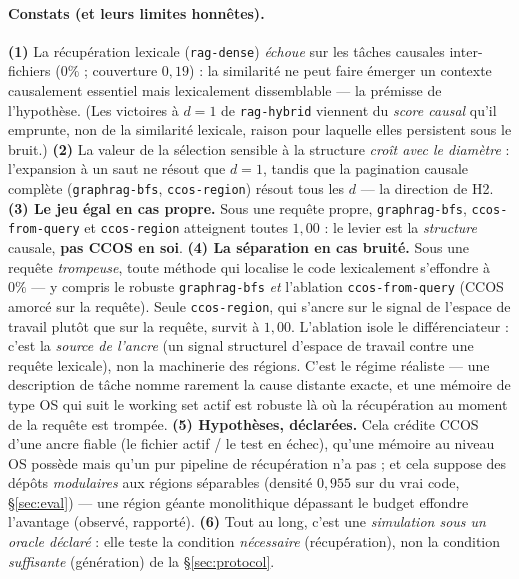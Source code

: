 \documentclass[11pt]{article}
\newcommand{\code}[1]{\texttt{#1}}
\begin{document}
\paragraph{Constats (et leurs limites honnêtes).}
\textbf{(1)} La récupération lexicale (\code{rag-dense}) \emph{échoue} sur les tâches
causales inter-fichiers ($0\%$ ; couverture $0{,}19$) : la similarité ne peut faire
émerger un contexte causalement essentiel mais lexicalement dissemblable --- la
prémisse de l'hypothèse. (Les victoires à $d{=}1$ de \code{rag-hybrid} viennent du
\emph{score causal} qu'il emprunte, non de la similarité lexicale, raison pour
laquelle elles persistent sous le bruit.)
\textbf{(2)} La valeur de la sélection sensible à la structure \emph{croît avec le
diamètre} : l'expansion à un saut ne résout que $d{=}1$, tandis que la pagination
causale complète (\code{graphrag-bfs}, \code{ccos-region}) résout tous les $d$ --- la
direction de H2.
\textbf{(3) Le jeu égal en cas propre.} Sous une requête propre, \code{graphrag-bfs},
\code{ccos-from-query} et \code{ccos-region} atteignent toutes $1{,}00$ : le levier est
la \emph{structure} causale, \textbf{pas CCOS en soi}.
\textbf{(4) La séparation en cas bruité.} Sous une requête \emph{trompeuse}, toute
méthode qui localise le code lexicalement s'effondre à $0\%$ --- y compris le robuste
\code{graphrag-bfs} \emph{et} l'ablation \code{ccos-from-query} (CCOS amorcé sur la
requête). Seule \code{ccos-region}, qui s'ancre sur le signal de l'espace de travail
plutôt que sur la requête, survit à $1{,}00$. L'ablation isole le différenciateur :
c'est la \emph{source de l'ancre} (un signal structurel d'espace de travail contre une
requête lexicale), non la machinerie des régions. C'est le régime réaliste --- une
description de tâche nomme rarement la cause distante exacte, et une mémoire de type OS
qui suit le working set actif est robuste là où la récupération au moment de la requête
est trompée.
\textbf{(5) Hypothèses, déclarées.} Cela crédite CCOS d'une ancre fiable (le fichier
actif / le test en échec), qu'une mémoire au niveau OS possède mais qu'un pur pipeline
de récupération n'a pas ; et cela suppose des dépôts \emph{modulaires} aux régions
séparables (densité $0{,}955$ sur du vrai code, \S\ref{sec:eval}) --- une région géante
monolithique dépassant le budget effondre l'avantage (observé, rapporté).
\textbf{(6)} Tout au long, c'est une \emph{simulation sous un oracle déclaré} : elle
teste la condition \emph{nécessaire} (récupération), non la condition
\emph{suffisante} (génération) de la \S\ref{sec:protocol}.
\end{document}
